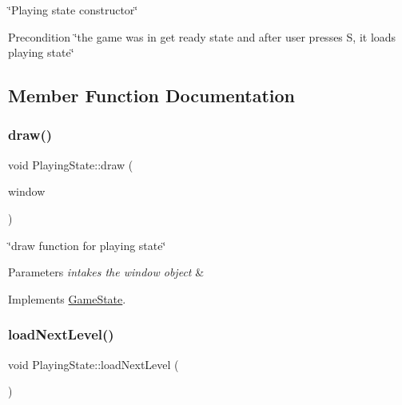 \char`\"{}\+Playing state constructor\char`\"{} 

\begin{DoxyPrecond}{Precondition}
\char`\"{}the game was in get ready state and after user presses S, it loads playing state\char`\"{} 
\end{DoxyPrecond}


\subsection{Member Function Documentation}
\mbox{\label{classPlayingState_ad7ac98b6b522060dbff840ce2f5d38d0}} 
\subsubsection{\texorpdfstring{draw()}{draw()}}
{\footnotesize\ttfamily void Playing\+State\+::draw (\begin{DoxyParamCaption}\item[{sf\+::\+Render\+Window \&}]{window }\end{DoxyParamCaption})\hspace{0.3cm}{\ttfamily [virtual]}}



\char`\"{}draw function for playing state\char`\"{} 


\begin{DoxyParams}{Parameters}
{\em intakes the window object} & \\
\hline
\end{DoxyParams}


Implements \hyperlink{classGameState_a3131198be0dee9ad887fc48a02d626e3}{Game\+State}.

\mbox{\label{classPlayingState_abbf53be223552107f95020420d045a10}} 
\subsubsection{\texorpdfstring{load\+Next\+Level()}{loadNextLevel()}}
{\footnotesize\ttfamily void Playing\+State\+::load\+Next\+Level (\begin{DoxyParamCaption}{ }\end{DoxyParamCaption})}



